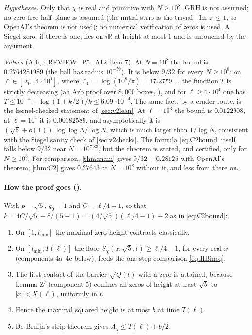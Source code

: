 \documentclass[11pt]{article}
\theoremstyle{definition}
\newcommand{\im}{\operatorname{Im}}
\newcommand{\R}{\mathbb{R}}
\newcommand{\Lc}{\Lambda}
\begin{document}
\noindent
\emph{Hypotheses.} Only that $\chi$ is real and primitive with $N \ge 10^8$. GRH is not assumed; no zero-free half-plane is assumed (the initial strip is the trivial $|\im z| \le 1$, so OpenAI's theorem is not used); no numerical verification of zeros is used. A Siegel zero, if there is one, lies on $i\R$ at height at most $1$ and is untouched by the argument.

\emph{Values} (Arb, \cite[P5 memo \S A.13.1]{dq1records}; REVIEW\_P5\_A12 item 7). At $N = 10^8$ the bound is $0.2764281989$ (the ball has radius $10^{-59}$). It is below $9/32$ for every $N \ge 10^8$: on $\ell \in [\ell_0, 4\cdot10^4]$, where $\ell_0 = \log(10^8/\pi) = 17.2759\ldots$, the function $T$ is strictly decreasing (an Arb proof over $8{,}000$ boxes, ), and for $\ell \ge 4\cdot10^4$ one has $T \le 10^{-4} + \log(1 + k/2)/k \le 6.09\cdot10^{-4}$. The same fact, by a cruder route, is the kernel-checked statement of \cref{sec:v2lean}. At $\ell = 10^3$ the bound is $0.0122908$, at $\ell = 10^4$ it is $0.00182589$, and asymptotically it is $(\sqrt5 + o(1))\,\log\log N/\log N$, which is much larger than $1/\log N$, consistent with the Siegel sanity check of \cref{sec:v2checks}. The formula \eqref{eq:C2bound} itself falls below $9/32$ near $N = 10^{7.83}$, but the theorem is stated, and certified, only for $N \ge 10^8$. For comparison, \cref{thm:main} gives $9/32 = 0.28125$ with OpenAI's theorem; \cref{thm:C2} gives $0.27643$ at $N = 10^8$ without it, and less from there on.

\paragraph{How the proof goes (\cite[P5 memo \S A.13.3]{dq1records}).} With $p = \sqrt5$, $q_0 = 1$ and $C = \ell/4 - 1$, so that $k = 4C/\sqrt5 - 8/(5-1) = (4/\sqrt5)(\ell/4 - 1) - 2$ as in \eqref{eq:C2bound}:
\begin{enumerate}
\item On $[0, t_{\min}]$ the maximal zero height contracts classically.
\item On $[t_{\min}, T(\ell)]$ the floor $S_\chi(x,\sqrt5,t) \ge \ell/4 - 1$, for every real $x$ (components 4a--4c below), feeds the one-step comparison \eqref{eq:HBineq}.
\item The first contact of the barrier $\sqrt{Q(t)}$ with a zero is attained, because Lemma Z$'$ (component 5) confines all zeros of height at least $\sqrt b$ to $|x| < X(\ell)$, uniformly in $t$.
\item Hence the maximal squared height is at most $b$ at time $T(\ell)$.
\item De Bruijn's strip theorem gives $\Lc_\chi \le T(\ell) + b/2$.
\end{enumerate}
\end{document}
